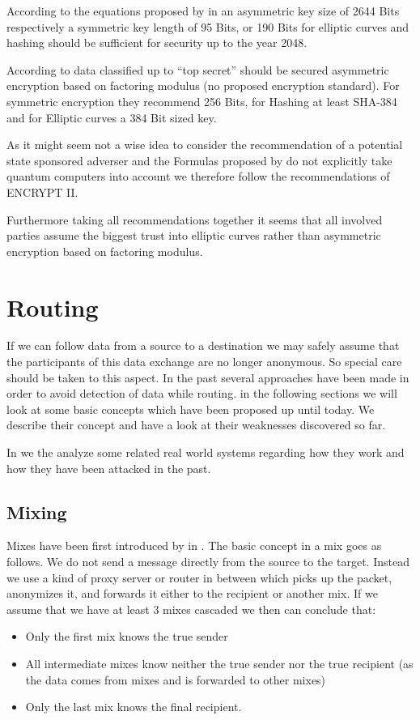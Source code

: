 According to the equations proposed by \citeauthor{Lenstra04keylength.} in \cite{Lenstra04keylength.} an asymmetric key size of 2644 Bits respectively a symmetric key length of 95 Bits, or 190 Bits for elliptic curves and hashing should be sufficient for security up to the year 2048. 

According to \cite{nsa-fact-sheet-B} data classified up to ``top secret'' should be secured asymmetric encryption based on factoring modulus (no proposed encryption standard).  For symmetric encryption they recommend 256 Bits, for Hashing at least SHA-384 and for Elliptic curves a 384 Bit sized key.

As it might seem not a wise idea to consider the recommendation of a potential state sponsored adverser and the Formulas proposed by \citeauthor{Lenstra04keylength.} do not explicitly take quantum computers into account we therefore follow the recommendations of ENCRYPT II.

Furthermore taking all recommendations together it seems that all involved parties assume the biggest trust into elliptic curves rather than asymmetric encryption based on factoring modulus.

\section{Routing}
If we can follow data from a source to a destination we may safely assume that the participants of this data exchange are no longer anonymous. So special care should be taken to this aspect. In the past several approaches have been made in order to avoid detection of data while routing. in the following sections we will look at some basic concepts which have been proposed up until today. We describe their concept and have a look at their weaknesses discovered so far.

In  we the analyze some related real world systems regarding how they work and how they have been attacked in the past.

\subsection{Mixing\label{sec:mixnets}}
Mixes have been first introduced by \cite{CHAUM1} in \citeyear{CHAUM1}. The basic concept in a mix goes as follows. We do not send a message directly from the source to the target. Instead we use a kind of proxy server or router in between which picks up the packet, anonymizes it, and forwards it either to the recipient or another mix. If we assume that we have at least 3 mixes cascaded we then can conclude that:
\begin{itemize}
	\item Only the first mix knows the true sender
	\item All intermediate mixes know neither the true sender nor the true recipient (as the data comes from mixes and is forwarded to other mixes) 
	\item Only the last mix knows the final recipient.
\end{itemize}

